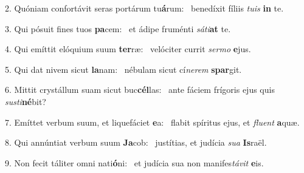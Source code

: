 2. Quóniam confortávit seras portárum tu\textbf{á}rum: \ast\  benedíxit fíliis \textit{tu}\textit{is} \textbf{in} te.\

3. Qui pósuit fines tuos \textbf{pa}cem: \ast\  et ádipe fruménti \textit{sá}\textit{ti}\textbf{at} te.\

4. Qui emíttit elóquium suum \textbf{ter}ræ: \ast\  velóciter currit \textit{ser}\textit{mo} \textbf{e}jus.\

5. Qui dat nivem sicut \textbf{la}nam: \ast\  nébulam sicut cí\textit{ne}\textit{rem} \textbf{spar}git.\

6. Mittit crystállum suam sicut buc\textbf{cél}las: \ast\  ante fáciem frígoris ejus quis \textit{sus}\textit{ti}\textbf{né}bit?\

7. Emíttet verbum suum, et liquefáciet \textbf{e}a: \ast\  flabit spíritus ejus, et \textit{flu}\textit{ent} \textbf{a}quæ.\

8. Qui annúntiat verbum suum \textbf{Ja}cob: \ast\  justítias, et judícia \textit{su}\textit{a} \textbf{Is}raël.\

9. Non fecit táliter omni nati\textbf{ó}ni: \ast\  et judícia sua non manifes\textit{tá}\textit{vit} \textbf{e}is.\

